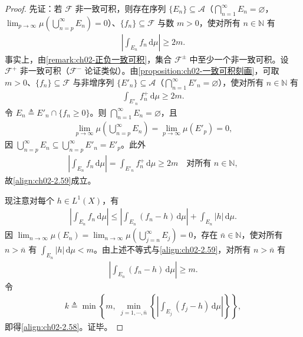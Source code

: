 \documentclass[../../main.tex]{subfiles}%
\begin{document}
\begin{proof}
先证：若 $\mathscr F$ 非一致可积，则存在序列 $\{E_n\}\subseteq\mathscr A$（$\bigcap_{n=1}^\infty E_n=\varnothing $，$\lim_{p\to\infty}\mu(\bigcup_{n=p}^\infty E_n)=0$）、$\{f_n\}\subseteq\mathscr F$ 与数 $m>0$，使对所有 $n\in\mathbb N$ 有
\begin{align}
\left|\int_{E_n}f_n\,\mathrm{d}\mu\right|\geqslant 2m. \label{align:ch02-2.59}
\end{align}
事实上，由\cref{remark:ch02-正负一致可积}，集合 $\mathscr F^\pm$ 中至少一个非一致可积。设 $\mathscr F^+$ 非一致可积（$\mathscr F^-$ 论证类似）。由\cref{proposition:ch02-一致可积刻画}，可取 $m>0$、$\{f_n\}\subseteq\mathscr F$ 与非增序列 $\{E'_n\}\subseteq\mathscr A$（$\bigcap_{n=1}^\infty E'_n=\varnothing $），使对所有 $n\in\mathbb N$ 有
\begin{align*}
\int_{E'_n}f_n^+\,\mathrm{d}\mu\geqslant 2m.
\end{align*}
令 $E_n\triangleq E'_n\cap\{f_n\geqslant0\}$。则 $\bigcap_{n=1}^\infty E_n=\varnothing $，且
\begin{align*}
\lim_{p\to\infty}\mu\left(\bigcup_{n=p}^\infty E_n\right)
=\lim_{p\to\infty}\mu(E'_p)=0,
\end{align*}
因 $\bigcup_{n=p}^\infty E_n\subseteq\bigcup_{n=p}^\infty E'_n=E'_p$。此外
\begin{align*}
\left|\int_{E_n}f_n\,\mathrm{d}\mu\right|=\int_{E'_n}f_n^+\,\mathrm{d}\mu\geqslant 2m\quad\text{对所有 }n\in\mathbb N,
\end{align*}
故\eqref{align:ch02-2.59}成立。

现注意对每个 $h\in L^1(X)$，有
\begin{align*}
\left|\int_{E_n}f_n\,\mathrm{d}\mu\right|
\leqslant\left|\int_{E_n}(f_n-h)\,\mathrm{d}\mu\right|+\int_{E_n}|h|\,\mathrm{d}\mu.
\end{align*}
因 $\lim_{n\to\infty}\mu(E_n)=\lim_{n\to\infty}\mu(\bigcup_{j=n}^\infty E_j)=0$，存在 $\bar n\in\mathbb N$，使对所有 $n>\bar n$ 有 $\int_{E_n}|h|\,\mathrm{d}\mu<m$。由上述不等式与\eqref{align:ch02-2.59}，对所有 $n>\bar n$ 有
\begin{align*}
\left|\int_{E_n}(f_n-h)\,\mathrm{d}\mu\right|\geqslant m.
\end{align*}
令
\begin{align*}
k\triangleq \min\left\{m,\ \min_{j=1,\cdots ,\bar n}\left\{\left|\int_{E_j}(f_j-h)\,\mathrm{d}\mu\right|\right\}\right\},
\end{align*}
即得\eqref{align:ch02-2.58}。证毕。
\end{proof}
\end{document}
